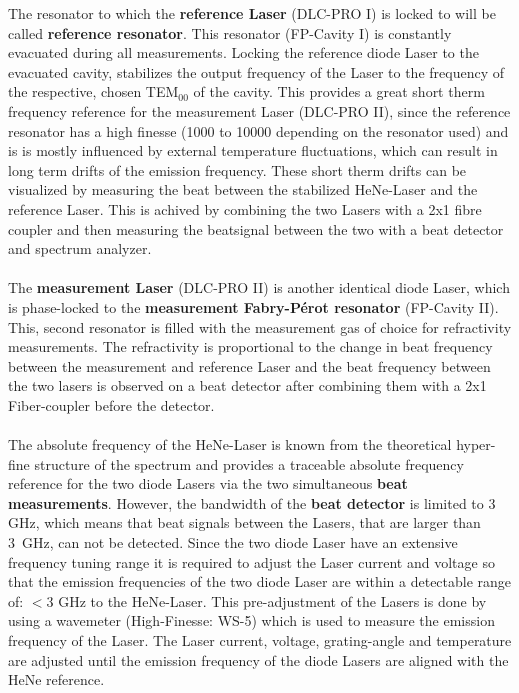 \noindent
The resonator to which the \textbf{reference Laser} (DLC-PRO I) is locked to will be called \textbf{reference resonator}. This resonator (FP-Cavity I) is constantly evacuated during all measurements. Locking the reference diode Laser to the evacuated cavity, stabilizes the output frequency of the Laser to the frequency of the respective, chosen TEM$_{00}$ of the cavity. This provides a great short therm frequency reference for the measurement Laser (DLC-PRO II), since the reference resonator has a high finesse (1000 to 10000 depending on the resonator used) and is is mostly influenced by external temperature fluctuations, which can result in long term drifts of the emission frequency. These short therm drifts can be visualized by measuring the beat between the stabilized HeNe-Laser and the reference Laser. This is achived by combining the two Lasers with a 2x1 fibre coupler and then measuring the beatsignal between the two with a beat detector and spectrum analyzer.\\\\
\noindent
The \textbf{measurement Laser} (DLC-PRO II) is another identical diode Laser, which is phase-locked to the \textbf{measurement Fabry-Pérot resonator} (FP-Cavity II). This, second resonator is filled with the measurement gas of choice for refractivity measurements. The refractivity is proportional to the change in beat frequency between the measurement and reference Laser and the beat frequency between the two lasers is observed on a beat detector after combining them with a 2x1 Fiber-coupler before the detector.\\\\
\noindent
The absolute frequency of the HeNe-Laser is known from the theoretical hyper-fine structure of the spectrum and provides a traceable absolute frequency reference for the two diode Lasers via the two simultaneous \textbf{beat measurements}. However, the bandwidth of the \textbf{beat detector} is limited to 3 GHz, which means that beat signals between the Lasers, that are larger than \mbox{3 GHz}, can not be detected. Since the two diode Laser have an extensive frequency tuning range it is required to adjust the Laser current and voltage so that the emission frequencies of the two diode Laser are within a detectable range of: $<3$ GHz to the HeNe-Laser. This pre-adjustment of the Lasers is done by using a wavemeter (High-Finesse: WS-5) which is used to measure the emission frequency of the Laser. The Laser current, voltage, grating-angle and temperature are adjusted until the emission frequency of the diode Lasers are aligned with the HeNe reference. \\\\
